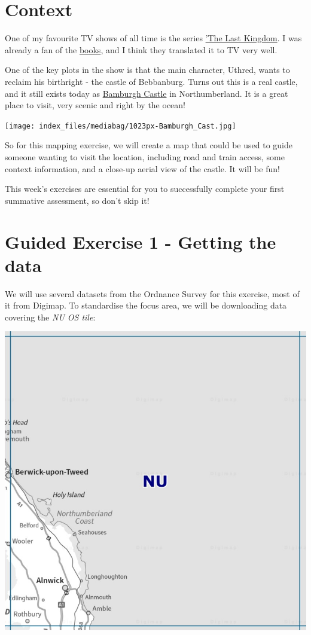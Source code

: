 \documentclass[
  letterpaper,
  DIV=11,
  numbers=noendperiod]{scrreprt}
\begin{document}
\section{Context}\label{context}

One of my favourite TV shows of all time is the series
\href{https://en.wikipedia.org/wiki/The_Last_Kingdom_(TV_series)}{'The
Last Kingdom}. I was already a fan of the
\href{https://en.wikipedia.org/wiki/The_Saxon_Stories}{books}, and I
think they translated it to TV very well.

One of the key plots in the show is that the main character, Uthred,
wants to reclaim his birthright - the castle of Bebbanburg. Turns out
this is a real castle, and it still exists today as
\href{https://en.wikipedia.org/wiki/Bamburgh_Castle}{Bamburgh Castle} in
Northumberland. It is a great place to visit, very scenic and right by
the ocean!

\texttt{[image: index\_files/mediabag/1023px-Bamburgh\_Cast.jpg]}

So for this mapping exercise, we will create a map that could be used to
guide someone wanting to visit the location, including road and train
access, some context information, and a close-up aerial view of the
castle. It will be fun!

This week's exercises are essential for you to successfully complete
your first summative assessment, so don't skip it!

\section{Guided Exercise 1 - Getting the
data}\label{guided-exercise-1---getting-the-data}

We will use several datasets from the Ordnance Survey for this exercise,
most of it from Digimap. To standardise the focus area, we will be
downloading data covering the \emph{NU OS tile}:

\includegraphics{images/lab_7/lab7_fig1_nu.jpg}
\end{document}
